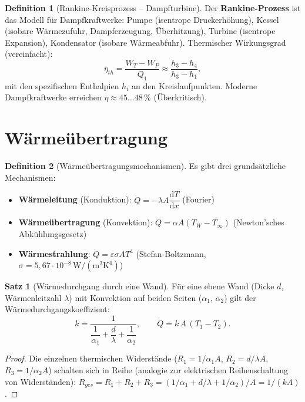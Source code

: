 ﻿\documentclass[a4paper,12pt]{report}
\theoremstyle{definition}
\newtheorem{definition}{Definition}
\newtheorem{satz}{Satz}
\begin{document}
\begin{definition}[Rankine-Kreisprozess -- Dampfturbine]
Der \textbf{Rankine-Prozess} ist das Modell f\"ur Dampfkraftwerke:
Pumpe (isentrope Druckerh\"ohung), Kessel (isobare W\"armezufuhr,
Dampferzeugung, \"Uberhitzung), Turbine (isentrope Expansion), Kondensator (isobare W\"armeabfuhr).
Thermischer Wirkungsgrad (vereinfacht):
\[
  \eta_{th} = \frac{W_T - W_P}{Q_1} \approx \frac{h_3 - h_4}{h_3 - h_1},
\]
mit den spezifischen Enthalpien $h_i$ an den Kreislaufpunkten.
Moderne Dampfkraftwerke erreichen $\eta \approx 45\ldots48\,\%$ (\"Uberkritisch).
\end{definition}

\section{W\"arme\"ubertragung}

\begin{definition}[W\"arme\"ubertragungsmechanismen]
Es gibt drei grunds\"atzliche Mechanismen:
\begin{itemize}
    \item[-] \textbf{W\"armeleitung} (Konduktion): $\dot{Q} = -\lambda A\dfrac{\mathrm{d}T}{\mathrm{d}x}$ (Fourier)
    \item[-] \textbf{W\"arme\"ubertragung} (Konvektion): $\dot{Q} = \alpha A (T_W - T_\infty)$ (Newton'sches Abk\"uhlungsgesetz)
    \item[-] \textbf{W\"armestrahlung}: $\dot{Q} = \varepsilon\sigma A T^4$ (Stefan-Boltzmann,
          $\sigma = 5{,}67\cdot10^{-8}\,\mathrm{W/(m^2 K^4)}$)
\end{itemize}
\end{definition}

\begin{satz}[W\"armedurchgang durch eine Wand]
F\"ur eine ebene Wand (Dicke $d$, W\"armenleitzahl $\lambda$) mit
Konvektion auf beiden Seiten ($\alpha_1$, $\alpha_2$) gilt der
W\"armedurchgangskoeffizient:
\[
  k = \frac{1}{\dfrac{1}{\alpha_1} + \dfrac{d}{\lambda} + \dfrac{1}{\alpha_2}},
  \qquad \dot{Q} = k\,A\,(T_1 - T_2).
\]
\end{satz}
\begin{proof}
Die einzelnen thermischen Widerst\"ande ($R_1 = 1/\alpha_1 A$,
$R_2 = d/\lambda A$, $R_3 = 1/\alpha_2 A$) schalten sich in Reihe
(analogie zur elektrischen Reihenschaltung von Widerst\"anden):
$R_{ges} = R_1 + R_2 + R_3 = (1/\alpha_1 + d/\lambda + 1/\alpha_2)/A = 1/(kA)$.
\end{proof}
\end{document}
